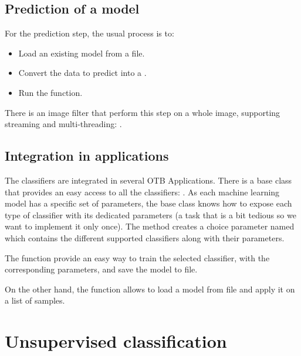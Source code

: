

\subsection{Prediction of a model}

For the prediction step, the usual process is to:
\begin{itemize}
\item Load an existing model from a file.
\item Convert the data to predict into a .
\item Run the  function.
\end{itemize}

There is an image filter that perform this step on a whole image, supporting
streaming and multi-threading: .

\ifitkFullVersion

\fi

\subsection{Integration in applications}

The classifiers are integrated in several OTB Applications. There is a base
class that provides an easy access to all the classifiers:
. As each machine learning
model has a specific set of parameters, the base class
 knows how to expose each type of classifier with
its dedicated parameters (a task that is a bit tedious so we want to implement
it only once). The  method creates a choice parameter named
 which contains the different supported classifiers along
with their parameters.

The function  provide an easy way to train the selected
classifier, with the corresponding parameters, and save the model to file.

On the other hand, the function  allows to load a model
from file and apply it on a list of samples.

\section{Unsupervised classification}

